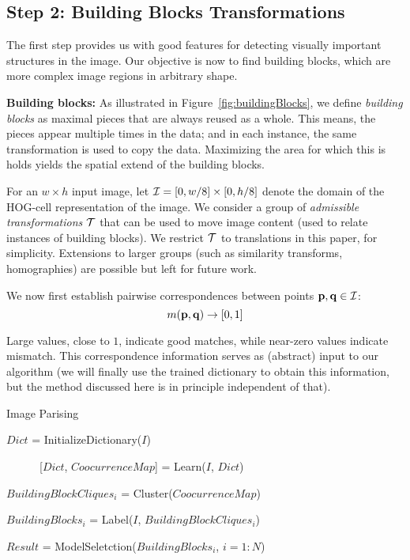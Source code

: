 \documentclass{acmtog}
\begin{document}
\subsection{Step 2: Building Blocks Transformations}
\label{sec:ComputingCooC}

The first step provides us with good features for detecting visually important structures in the image. Our objective is now to find building blocks, which are more complex image regions in arbitrary shape.

\textbf{Building blocks:} As illustrated in Figure~\ref{fig:buildingBlocks}, we define \emph{building blocks} as maximal pieces that are always reused as a whole. This means, the pieces appear multiple times in the data; and in each instance, the same transformation is used to copy the data. Maximizing the area for which this is holds yields the spatial extend of the building blocks.


For an $w \times h$ input image, let $\mathcal{I} = [0,w/8] \times [0, h/8]$ denote the domain of the HOG-cell representation of the image. We consider a group of \emph{admissible transformations} $\mathcal{T}$ that can be used to move image content (used to relate instances of building blocks). We restrict $\mathcal{T}$ to translations in this paper, for simplicity. Extensions to larger groups (such as similarity transforms, homographies) are possible but left for future work.

We now first establish pairwise correspondences between points $\mathbf{p}, \mathbf{q} \in \mathcal{I}$:
%
\begin{equation}
m(\mathbf{p}, \mathbf{q}) \rightarrow [0,1]
\label{eq:correspondences}
\end{equation}

Large values, close to $1$, indicate good matches, while near-zero values indicate mismatch. This correspondence information serves as (abstract) input to our algorithm (we will finally use the trained dictionary to obtain this information, but the method discussed here is in principle independent of that).

\begin{algorithm}
\caption{Image Parising}\label{alg:ImageParsing}
\begin{algorithmic}[1]

     $Dict$ = InitializeDictionary($I$)
			
			
			    \ \ \ \ \ \ [$Dict$, $CoocurrenceMap$] = Learn($I$, $Dict$)
			
			\EndFor
			
\State			$BuildingBlockCliques_{i}$ = Cluster($CoocurrenceMap$)
			
\State			$BuildingBlocks_{i}$ = Label($I$, $BuildingBlockCliques_{i}$)
     \EndFor
			
\State $Result$ = ModelSeletction($BuildingBlocks_{i}$, $i = 1:N$)			
\end{algorithmic}
\end{algorithm}
\end{document}
